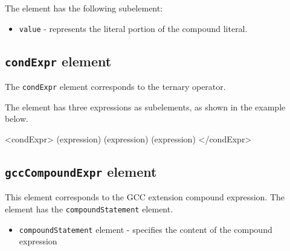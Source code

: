 The element has the following subelement:

\begin{itemize}
\item {\tt value} - represents the literal portion of the compound literal.
\end{itemize}


\subsection{ {\tt condExpr} element}

The {\tt condExpr} element corresponds to the ternary operator. 

The element has three expressions as subelements, as shown in the example below.
\vspace{2mm}

\begin{XcodeMLExample}
  <condExpr>
    (expression)
    (expression)
    (expression)
  </condExpr>
\end{XcodeMLExample}


\subsection{ {\tt gccCompoundExpr} element}

This element corresponds to the GCC extension compound expression. 
The element has the {\tt compoundStatement} element.

\begin{itemize}
\item {\tt compoundStatement} element - specifies the content of the compound expression
\end{itemize}


